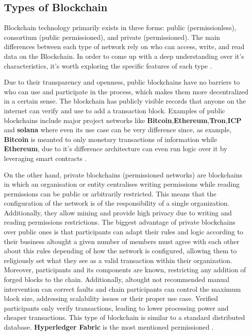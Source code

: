 \subsection{Types of Blockchain}
Blockchain technology primarily exists in three forms: public (permissionless), consortium (public permissioned), and private (permissioned). The main differences between each type of network rely on who can access, write, and read data on the Blockchain. In order to come up with a deep understanding over it's characteristics, it's worth exploring the specific features of each type \cite{blockchain-in-heathcare}.

Due to their transparency and openness, public blockchains have no barriers to who can use and participate in the process, which makes them more decentralized in a certain sense.  The blockchain has publicly visible records that anyone on the internet can verify and use to add a transaction block. Examples of public blockchains include major project networks like \textbf{Bitcoin},\textbf{Ethereum},\textbf{Tron},\textbf{ICP} and \textbf{solana} where even its use case can be very difference since, as example, \textbf{Bitcoin} is meanted to only monetary transactions of information while \textbf{Ethereum}, due to it's difference architecture can even run logic over it by leveraging smart contracts  \cite{introduction-blockchain} \cite{blockchain-security-issues-and-challenges}.


On the other hand, private blockchains (permissioned networks) are blockchains in which an organisation or entity centralises writing permissions while reading permissions can be public or arbitrarily restricted. This means that the configuration of the network is of the responsibility of a single organization. Additionally, they allow mining and provide high privacy due to writing and reading permissions restrictions. The biggest advantage of private blockchains over public ones is that participants can adapt their rules and logic according to their business altought a given number of members must agree with each other about this rules depending of how the network is configured, allowing them to religiously set what they see as a valid transaction within their organization. Moreover, participants and its components are known, restricting any addition of forged blocks to the chain. Additionally, altought not recommended manual intervention can correct faults and chain participants can control the maximum block size, addressing scalability issues or their proper use case. Verified participants only verify transactions, leading to lower processing power and cheaper transactions. This type of blockchain is similar to a standard distributed database. \textbf{Hyperledger Fabric} is the most mentioned permissioned  \cite{data-processing-view-blockchain}.

